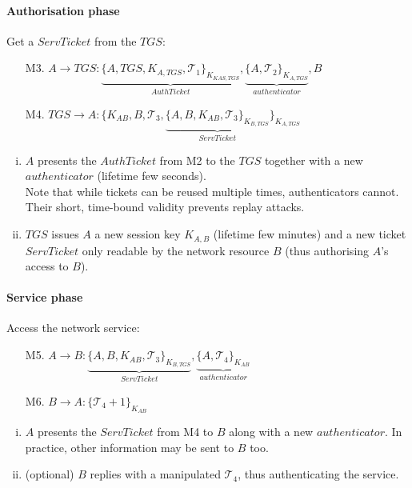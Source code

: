 \paragraph{Authorisation phase} Get a $ServTicket$ from the $TGS$:

\begin{itemize}[leftmargin=4cm]
    \item [M3.] $A \rightarrow TGS:  \underbrace{ \{A, TGS, K_{A,TGS}, \mathcal{T}_1 \}_{K_{KAS,TGS}} }_{AuthTicket}, \underbrace{ \{A, \mathcal{T}_2 \}_{K_{A,TGS}} }_{authenticator}, B $
    \item [M4.] $TGS \rightarrow A: \{ K_{AB}, B, \mathcal{T}_3, \underbrace{ \{ A, B, K_{AB}, \mathcal{T}_3 \}_{K_{B,TGS}} }_{ServTicket} \}_{K_{A,TGS}}$
\end{itemize}

\begin{enumerate}[i)]
    \item $A$ presents the $AuthTicket$ from M2 to the $TGS$ together with a new $authenticator$ (lifetime few seconds).\\
    Note that while tickets can be reused multiple times, authenticators cannot. Their short, time-bound validity prevents replay attacks.
    \item $TGS$ issues $A$ a new session key $K_{A,B}$ (lifetime few minutes) and a new ticket $ServTicket$ only readable by the network resource $B$ (thus authorising $A$'s access to $B$).
\end{enumerate}

\paragraph{Service phase} Access the network service:

\begin{itemize}[leftmargin=4cm]
    \item [M5.] $A \rightarrow B: \underbrace{ \{ A, B, K_{AB}, \mathcal{T}_3 \}_{K_{B,TGS}} }_{ServTicket}, \underbrace{ \{A, \mathcal{T}_4\}_{K_{AB}} }_{authenticator} $
    \item [M6.] $B \rightarrow A: \{ \mathcal{T}_4 + 1 \}_{K_{AB}}$
\end{itemize}

\begin{enumerate}[i)]
    \item $A$ presents the $ServTicket$ from M4 to $B$ along with a new $authenticator$. In practice, other information may be sent to $B$ too.
    \item (optional) $B$ replies with a manipulated $\mathcal{T}_4$, thus authenticating the service.
\end{enumerate}

